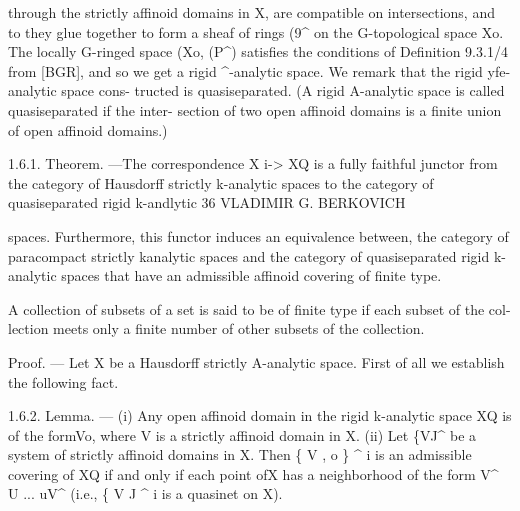 \documentclass[
  10pt,
]{article}
\newenvironment{Shaded}{}{}
\newcommand{\NormalTok}[1]{#1}
\begin{document}
\begin{Shaded}
\begin{Highlighting}[]
\NormalTok{through the strictly affinoid domains in X, are compatible on intersections, and to they}
\NormalTok{glue together to form a sheaf of rings (9\^{} on the G{-}topological space Xo. The locally}
\NormalTok{G{-}ringed space (Xo, (P\^{}) satisfies the conditions of Definition 9.3.1/4 from [BGR],}
\NormalTok{and so we get a rigid \^{}{-}analytic space. We remark that the rigid yfe{-}analytic space cons{-}}
\NormalTok{tructed is quasiseparated. (A rigid A{-}analytic space is called quasiseparated if the inter{-}}
\NormalTok{section of two open affinoid domains is a finite union of open affinoid domains.)}

\NormalTok{       1.6.1. Theorem. —The correspondence X i{-}\textgreater{} XQ is a fully faithful junctor from the}
\NormalTok{category of Hausdorff strictly k{-}analytic spaces to the category of quasiseparated rigid k{-}andlytic}
\NormalTok{36}
\NormalTok{                                    VLADIMIR G. BERKOVICH}

\NormalTok{spaces. Furthermore, this functor induces an equivalence between, the category of paracompact strictly}
\NormalTok{k\textquotesingle{}analytic spaces and the category of quasiseparated rigid k{-}analytic spaces that have an admissible}
\NormalTok{affinoid covering of finite type.}

\NormalTok{      A collection of subsets of a set is said to be of finite type if each subset of the col{-}}
\NormalTok{lection meets only a finite number of other subsets of the collection.}

\NormalTok{      Proof. — Let X be a Hausdorff strictly A{-}analytic space. First of all we establish}
\NormalTok{the following fact.}

\NormalTok{      1.6.2. Lemma. — (i) Any open affinoid domain in the rigid k{-}analytic space XQ is of the}
\NormalTok{formVo, where V is a strictly affinoid domain in X.}
\NormalTok{      (ii) Let \{VJ\^{} be a system of strictly affinoid domains in X. Then \{ V , o \} \^{} i is}
\NormalTok{ an admissible covering of XQ if and only if each point ofX has a neighborhood of the form}
\NormalTok{ V\^{} U ... uV\^{} (i.e., \{ V J \^{} i is a quasinet on X).}


\end{Highlighting}
\end{Shaded}
\end{document}
